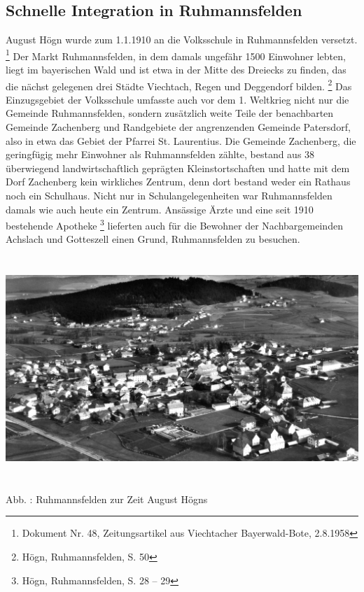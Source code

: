 \documentclass[a4paper]{article}
\newcounter{Abb}
\renewcommand\theAbb{\arabic{Abb}}
\begin{document}
\subsection{Schnelle Integration in Ruhmannsfelden}
\hypertarget{RefHeadingToc100333729}{}August Högn wurde zum 1.1.1910 an
die Volksschule in Ruhmannsfelden versetzt. \footnote{Dokument Nr. 48,
Zeitungsartikel aus Viechtacher Bayerwald-Bote, 2.8.1958} Der Markt
Ruhmannsfelden, in dem damals ungefähr 1500 Einwohner lebten, liegt im
bayerischen Wald und ist etwa in der Mitte des Dreiecks zu finden, das
die nächst gelegenen drei Städte Viechtach, Regen und Deggendorf
bilden. \footnote{Högn, Ruhmannsfelden, S. 50} Das Einzugsgebiet der
Volksschule umfasste auch vor dem 1. Weltkrieg nicht nur die Gemeinde
Ruhmannsfelden, sondern zusätzlich weite Teile der benachbarten
Gemeinde Zachenberg und Randgebiete der angrenzenden Gemeinde
Patersdorf, also in etwa das Gebiet der Pfarrei St. Laurentius. Die
Gemeinde Zachenberg, die geringfügig mehr Einwohner als Ruhmannsfelden
zählte, bestand aus 38 überwiegend landwirtschaftlich geprägten
Kleinstortschaften und hatte mit dem Dorf Zachenberg kein wirkliches
Zentrum, denn dort bestand weder ein Rathaus noch ein Schulhaus. Nicht
nur in Schulangelegenheiten war Ruhmannsfelden damals wie auch heute
ein Zentrum. Ansässige Ärzte und eine seit 1910 bestehende
Apotheke \footnote{Högn, Ruhmannsfelden, S. 28 – 29} lieferten auch für
die Bewohner der Nachbargemeinden Achslach und Gotteszell einen Grund,
Ruhmannsfelden zu besuchen.


\includegraphics[width=15.981cm,height=8.446cm]{pictures/zulassungsarbeit-img016.jpg}


Abb. \stepcounter{Abb}{\theAbb}: Ruhmannsfelden zur Zeit August Högns
\end{document}

